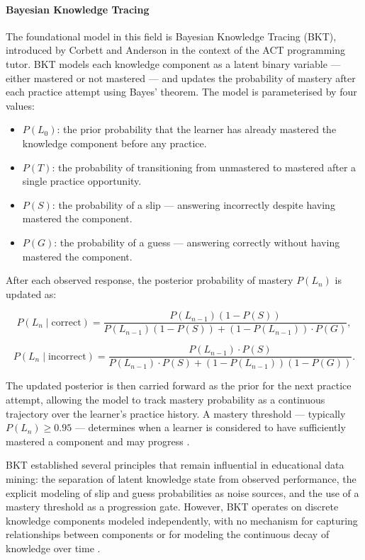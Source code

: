 \paragraph{Bayesian Knowledge Tracing}
The foundational model in this field is Bayesian Knowledge Tracing (BKT), introduced by Corbett and Anderson \cite{corbett1994} in the context of the ACT programming tutor. BKT models each knowledge component as a latent binary variable — either mastered or not mastered — and updates the probability of mastery after each practice attempt using Bayes' theorem. The model is parameterised by four values:

\begin{itemize}
    \item $P(L_0)$: the prior probability that the learner has already 
    mastered the knowledge component before any practice.
    \item $P(T)$: the probability of transitioning from unmastered to 
    mastered after a single practice opportunity.
    \item $P(S)$: the probability of a slip — answering incorrectly 
    despite having mastered the component.
    \item $P(G)$: the probability of a guess — answering correctly 
    without having mastered the component.
\end{itemize}

After each observed response, the posterior probability of mastery 
$P(L_n)$ is updated as:

\begin{equation}
P(L_n \mid \text{correct}) = \frac{P(L_{n-1})(1 - P(S))}{P(L_{n-1})(1 - P(S)) + (1 - P(L_{n-1})) \cdot P(G)},
\end{equation}

\begin{equation}
P(L_n \mid \text{incorrect}) = \frac{P(L_{n-1}) \cdot P(S)}{P(L_{n-1}) \cdot P(S) + (1 - P(L_{n-1}))(1 - P(G))}.
\end{equation}

The updated posterior is then carried forward as the prior for the next practice attempt, allowing the model to track mastery probability as a continuous trajectory over the learner's practice history. A mastery threshold — typically $P(L_n) \geq 0.95$ — determines when a learner is considered to have sufficiently mastered a component and may progress \cite{corbett1994}.

BKT established several principles that remain influential in educational data mining: the separation of latent knowledge state from observed performance, the explicit modeling of slip and guess probabilities as noise sources, and the use of a mastery threshold as a progression gate. However, BKT operates on discrete knowledge components modeled independently, with no mechanism for capturing relationships between components or for modeling the continuous decay of knowledge over time \cite{pardos2010}.

